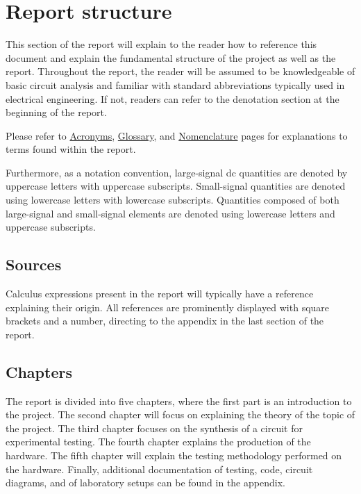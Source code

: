 \chapter*{Report structure} \label{cha:report_structure}
This section of the report will explain to the reader how to reference this document and explain the fundamental structure of the project as well as the report. Throughout the report, the reader will be assumed to be knowledgeable of basic circuit analysis and familiar with standard abbreviations typically used in electrical engineering. If not, readers can refer to the denotation section at the beginning of the report.

Please refer to \hyperref[cha:acronyms]{Acronyms}, \hyperref[cha:glossary]{Glossary}, and \hyperref[cha:nomenclature]{Nomenclature} pages for explanations to terms found within the report.

Furthermore, as a notation convention, large-signal \gls{dc} quantities are denoted by uppercase letters with uppercase subscripts. Small-signal quantities are denoted using lowercase letters with lowercase subscripts. Quantities composed of both large-signal and small-signal elements are denoted using lowercase letters and uppercase subscripts.

\section*{Sources}
Calculus expressions present in the report will typically have a reference explaining their origin. All references are prominently displayed with square brackets and a number, directing to the appendix in the last section of the report.

\section*{Chapters}
The report is divided into five chapters, where the first part is an introduction to the project. The second chapter will focus on explaining the theory of the topic of the project. The third chapter focuses on the synthesis of a circuit for experimental testing. The fourth chapter explains the production of the hardware. The fifth chapter will explain the testing methodology performed on the hardware. Finally, additional documentation of testing, code, circuit diagrams, and of laboratory setups can be found in the appendix.